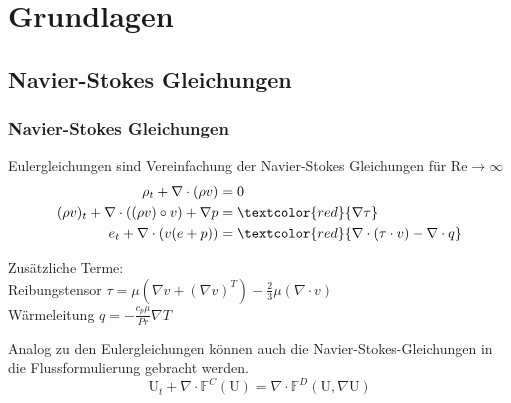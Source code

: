\documentclass[
	11pt, %
	aspectratio=169, %
]{beamer}
\begin{document}
\section{Grundlagen} %

\subsection{Navier-Stokes Gleichungen}


\begin{frame}
	\frametitle{Navier-Stokes Gleichungen}
	Eulergleichungen sind Vereinfachung der Navier-Stokes Gleichungen für $\mathrm{Re} \rightarrow \infty$\\
	\begin{equation}
	\begin{split}
		\rho_t + \nabla\cdot (\rho v) &= 0\\
		(\rho v)_t + \nabla\cdot ((\rho v)\circ v) + \nabla p &= \textcolor{red}{\nabla \tau} \\
		e_t + \nabla \cdot (v(e+p)) &= \textcolor{red}{\nabla \cdot (\tau \cdot v) - \nabla \cdot q}  \\
	\end{split}
\end{equation}



	

	Zusätzliche Terme:\\
	Reibungstensor $\tau = \mu (\nabla v + (\nabla v)^T) - \frac{2}{3}\mu (\nabla \cdot v)$\\
	Wärmeleitung $q = -\frac{c_p\mu}{Pr}\nabla T$\\
	\newline

	Analog zu den Eulergleichungen können auch die Navier-Stokes-Gleichungen in die Flussformulierung gebracht werden.
	\begin{equation}
		\mathrm{U}_t + \nabla \cdot \mathbb{F}^C (\mathrm{U}) = \nabla \cdot \mathbb{F}^D(\mathrm{U}, \nabla \mathrm{U})
	\end{equation}




\end{frame}
\end{document}
